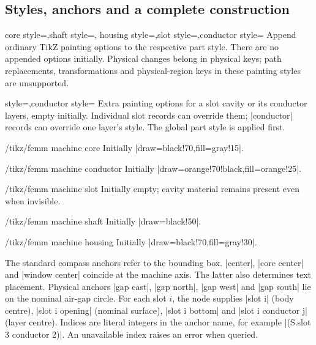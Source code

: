 \subsection{Styles, anchors and a complete construction}
\begin{keylist}{core style=,shaft style=,
 housing style=,slot style=,conductor style=}
Append ordinary TikZ painting options to the respective part style. There are
no appended options initially. Physical changes belong in physical keys;
path replacements, transformations and physical-region keys in these painting
styles are unsupported.
\end{keylist}
\begin{keylist}{style=,conductor style=}
Extra painting options for a slot cavity or its conductor layers, empty
initially. Individual slot records can override them; |conductor| records
can override one layer's style. The global part style is applied first.
\end{keylist}
\begin{stylekey}{/tikz/femm machine core}
Initially |draw=black!70,fill=gray!15|.
\end{stylekey}
\begin{stylekey}{/tikz/femm machine conductor}
Initially |draw=orange!70!black,fill=orange!25|.
\end{stylekey}
\begin{stylekey}{/tikz/femm machine slot}
Initially empty; cavity material remains present even when invisible.
\end{stylekey}
\begin{stylekey}{/tikz/femm machine shaft}
Initially |draw=black!50|.
\end{stylekey}
\begin{stylekey}{/tikz/femm machine housing}
Initially |draw=black!70,fill=gray!30|.
\end{stylekey}

The standard compass anchors refer to the bounding box. |center|,
|core center| and |window center| coincide at the machine axis. The latter
also determines text placement. Physical anchors |gap east|, |gap north|,
|gap west| and |gap south| lie on the nominal air-gap circle. For each slot
$i$, the node supplies |slot i| (body centre), |slot i opening| (nominal surface),
|slot i bottom| and |slot i conductor j| (layer centre). Indices are literal
integers in the anchor name, for example |(S.slot 3 conductor 2)|.
An unavailable index raises an error when queried.

